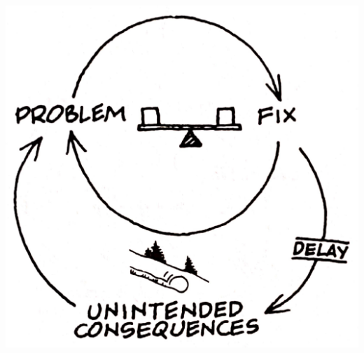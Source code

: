 \begin{multicols}{3}
	\includegraphics[width=0.8\linewidth]{pictures/archetype3}\\\
\end{multicols}

